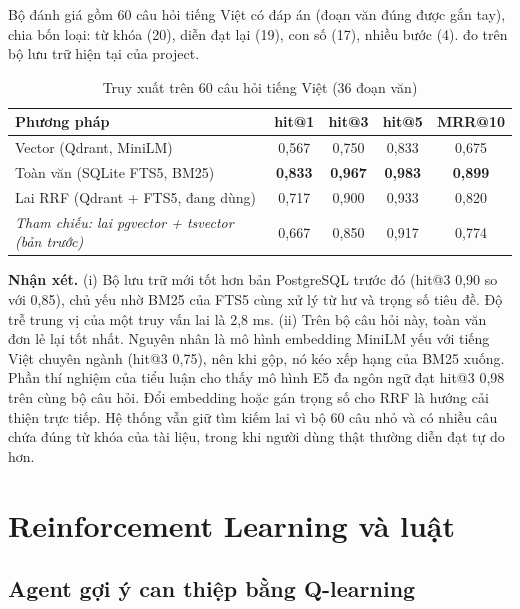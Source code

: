 Bộ đánh giá gồm 60 câu hỏi tiếng Việt có đáp án (đoạn văn đúng được gắn tay), chia bốn loại: từ khóa (20), diễn đạt lại (19), con số (17), nhiều bước (4).  đo trên bộ lưu trữ hiện tại của project.

\begin{table}[H]
\centering
\caption{Truy xuất trên 60 câu hỏi tiếng Việt (36 đoạn văn)}
\label{tab:rag}
\small
\begin{tabular}{@{}lcccc@{}}
\toprule
\textbf{Phương pháp} & \textbf{hit@1} & \textbf{hit@3} & \textbf{hit@5} & \textbf{MRR@10} \\
\midrule
Vector (Qdrant, MiniLM) & 0,567 & 0,750 & 0,833 & 0,675 \\
Toàn văn (SQLite FTS5, BM25) & \textbf{0,833} & \textbf{0,967} & \textbf{0,983} & \textbf{0,899} \\
Lai RRF (Qdrant + FTS5, đang dùng) & 0,717 & 0,900 & 0,933 & 0,820 \\
\midrule
\emph{Tham chiếu: lai pgvector + tsvector (bản trước)} & 0,667 & 0,850 & 0,917 & 0,774 \\
\bottomrule
\end{tabular}
\end{table}

\textbf{Nhận xét.} (i) Bộ lưu trữ mới tốt hơn bản PostgreSQL trước đó (hit@3 0,90 so với 0,85), chủ yếu nhờ BM25 của FTS5 cùng xử lý từ hư và trọng số tiêu đề. Độ trễ trung vị của một truy vấn lai là 2,8 ms. (ii) Trên bộ câu hỏi này, toàn văn đơn lẻ lại tốt nhất. Nguyên nhân là mô hình embedding MiniLM yếu với tiếng Việt chuyên ngành (hit@3 0,75), nên khi gộp, nó kéo xếp hạng của BM25 xuống. Phần thí nghiệm của tiểu luận cho thấy mô hình E5 đa ngôn ngữ đạt hit@3 0,98 trên cùng bộ câu hỏi. Đổi embedding hoặc gán trọng số cho RRF là hướng cải thiện trực tiếp. Hệ thống vẫn giữ tìm kiếm lai vì bộ 60 câu nhỏ và có nhiều câu chứa đúng từ khóa của tài liệu, trong khi người dùng thật thường diễn đạt tự do hơn.

\section{Reinforcement Learning và luật}
\label{sec:rl}

\subsection{Agent gợi ý can thiệp bằng Q-learning}

